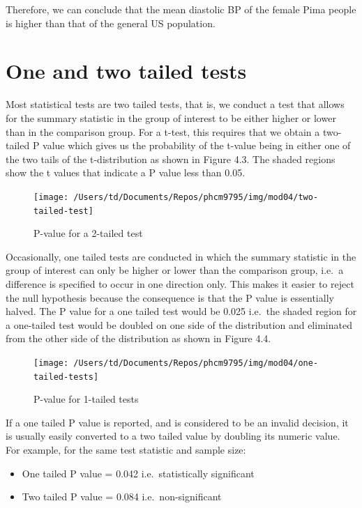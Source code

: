 \documentclass[
]{memoir}
\providecommand{\tightlist}{%
  \setlength{\itemsep}{0pt}\setlength{\parskip}{0pt}}
\begin{document}
Therefore, we can conclude that the mean diastolic BP of the female Pima people is higher than that of the general US population.

\hypertarget{one-and-two-tailed-tests}{%
\section{One and two tailed tests}\label{one-and-two-tailed-tests}}

Most statistical tests are two tailed tests, that is, we conduct a test that allows for the summary statistic in the group of interest to be either higher or lower than in the comparison group. For a t-test, this requires that we obtain a two-tailed P value which gives us the probability of the t-value being in either one of the two tails of the t-distribution as shown in Figure 4.3. The shaded regions show the t values that indicate a P value less than 0.05.

\begin{figure}
\texttt{[image: /Users/td/Documents/Repos/phcm9795/img/mod04/two-tailed-test]} \caption{P-value for a 2-tailed test}\label{fig:two-tailed-test}
\end{figure}

Occasionally, one tailed tests are conducted in which the summary statistic in the group of interest can only be higher or lower than the comparison group, i.e.~a difference is specified to occur in one direction only. This makes it easier to reject the null hypothesis because the consequence is that the P value is essentially halved. The P value for a one tailed test would be 0.025 i.e.~the shaded region for a one-tailed test would be doubled on one side of the distribution and eliminated from the other side of the distribution as shown in Figure 4.4.

\begin{figure}
\texttt{[image: /Users/td/Documents/Repos/phcm9795/img/mod04/one-tailed-tests]} \caption{P-value for 1-tailed tests}\label{fig:one-tailed-tests}
\end{figure}

If a one tailed P value is reported, and is considered to be an invalid decision, it is usually easily converted to a two tailed value by doubling its numeric value. For example, for the same test statistic and sample size:

\begin{itemize}
\tightlist
\item
  One tailed P value = 0.042 i.e.~statistically significant
\item
  Two tailed P value = 0.084 i.e.~non-significant
\end{itemize}
\end{document}
